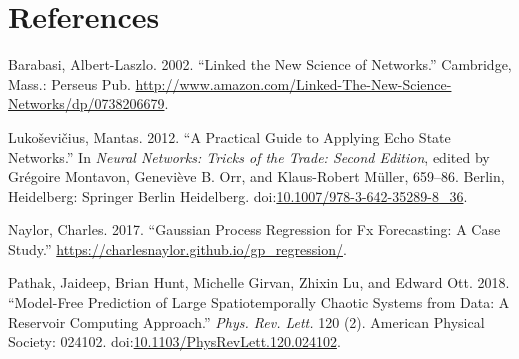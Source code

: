 \documentclass[]{article}
\begin{document}
\section*{References}\label{references}

\hypertarget{refs}{}
\hypertarget{ref-barabasi2002linked}{}
Barabasi, Albert-Laszlo. 2002. ``Linked the New Science of Networks.''
Cambridge, Mass.: Perseus Pub.
\url{http://www.amazon.com/Linked-The-New-Science-Networks/dp/0738206679}.

\hypertarget{ref-Luko2012}{}
Lukoševičius, Mantas. 2012. ``A Practical Guide to Applying Echo State
Networks.'' In \emph{Neural Networks: Tricks of the Trade: Second
Edition}, edited by Grégoire Montavon, Geneviève B. Orr, and
Klaus-Robert Müller, 659--86. Berlin, Heidelberg: Springer Berlin
Heidelberg.
doi:\href{https://doi.org/10.1007/978-3-642-35289-8_36}{10.1007/978-3-642-35289-8\_36}.

\hypertarget{ref-naylor_GP}{}
Naylor, Charles. 2017. ``Gaussian Process Regression for Fx Forecasting:
A Case Study.'' \url{https://charlesnaylor.github.io/gp_regression/}.

\hypertarget{ref-PhysRevLett.120.024102}{}
Pathak, Jaideep, Brian Hunt, Michelle Girvan, Zhixin Lu, and Edward Ott.
2018. ``Model-Free Prediction of Large Spatiotemporally Chaotic Systems
from Data: A Reservoir Computing Approach.'' \emph{Phys. Rev. Lett.} 120
(2). American Physical Society: 024102.
doi:\href{https://doi.org/10.1103/PhysRevLett.120.024102}{10.1103/PhysRevLett.120.024102}.
\end{document}
